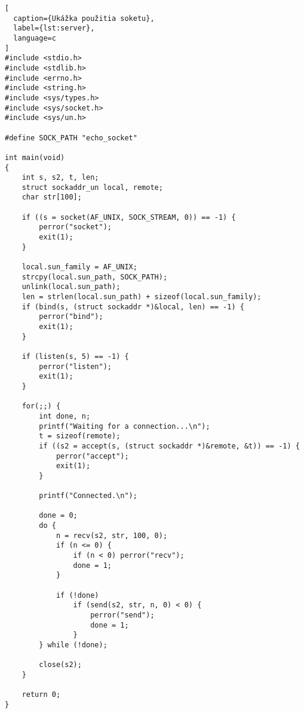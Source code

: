 \begin{lstlisting}[
  caption={Ukážka použitia soketu},
  label={lst:server},
  language=c
]
#include <stdio.h>
#include <stdlib.h>
#include <errno.h>
#include <string.h>
#include <sys/types.h>
#include <sys/socket.h>
#include <sys/un.h>

#define SOCK_PATH "echo_socket"

int main(void)
{
    int s, s2, t, len;
    struct sockaddr_un local, remote;
    char str[100];

    if ((s = socket(AF_UNIX, SOCK_STREAM, 0)) == -1) {
        perror("socket");
        exit(1);
    }

    local.sun_family = AF_UNIX;
    strcpy(local.sun_path, SOCK_PATH);
    unlink(local.sun_path);
    len = strlen(local.sun_path) + sizeof(local.sun_family);
    if (bind(s, (struct sockaddr *)&local, len) == -1) {
        perror("bind");
        exit(1);
    }

    if (listen(s, 5) == -1) {
        perror("listen");
        exit(1);
    }

    for(;;) {
        int done, n;
        printf("Waiting for a connection...\n");
        t = sizeof(remote);
        if ((s2 = accept(s, (struct sockaddr *)&remote, &t)) == -1) {
            perror("accept");
            exit(1);
        }

        printf("Connected.\n");

        done = 0;
        do {
            n = recv(s2, str, 100, 0);
            if (n <= 0) {
                if (n < 0) perror("recv");
                done = 1;
            }

            if (!done) 
                if (send(s2, str, n, 0) < 0) {
                    perror("send");
                    done = 1;
                }
        } while (!done);

        close(s2);
    }

    return 0;
}
\end{lstlisting}
